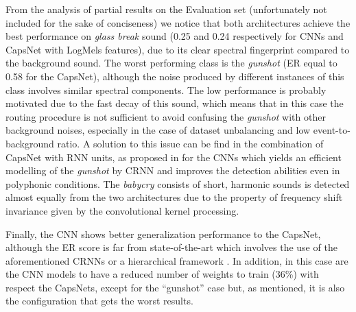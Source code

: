 From the analysis of partial results on the Evaluation set (unfortunately not included for the sake of conciseness) we notice that both architectures achieve the best performance on \textit{glass break} sound (0.25 and 0.24 respectively for CNNs and CapsNet with LogMels features), due to its clear spectral fingerprint compared to the background sound. The worst performing class is the \textit{gunshot} (ER equal to 0.58 for the CapsNet), although the noise produced by different instances of this class involves similar spectral components. The low performance is probably motivated due to the fast decay of this sound, which means that in this case the routing procedure is not sufficient to avoid confusing the \textit{gunshot} with other background noises, especially in the case of dataset unbalancing and low event-to-background ratio. A solution to this issue can be find in the combination of CapsNet with RNN units, as proposed in \cite{cakir2017convolutional} for the CNNs which yields an efficient modelling of the \textit{gunshot} by CRNN and improves the detection abilities even in polyphonic conditions. The \textit{babycry} consists of short, harmonic sounds is detected almost equally from the two architectures due to the property of frequency shift invariance given by the convolutional kernel processing. 

Finally, the CNN shows better generalization performance to the CapsNet, although the ER score is far from state-of-the-art which involves the use of the aforementioned CRNNs \cite{limrare} or a hierarchical framework \cite{vesperini2018hierarchic}. In addition, in this case are the CNN models to have a reduced number of weights to train (36\%) with respect the CapsNets, except for the ``gunshot'' case but, as mentioned, it is also the configuration that gets the worst results.


